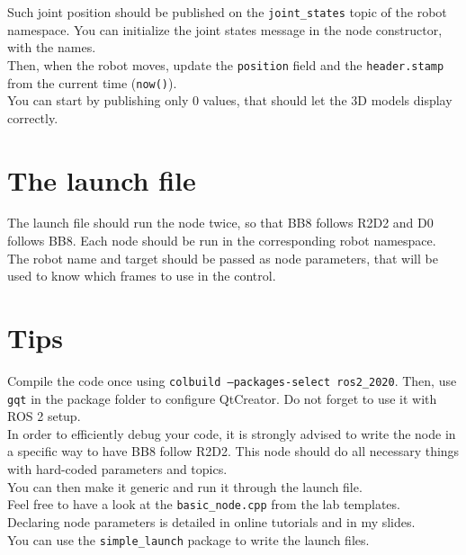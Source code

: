 \documentclass{ecnreport}
\begin{document}
Such joint position should be published on the \texttt{joint\_states} topic of the robot namespace. You can initialize the joint states message in the node constructor, with the names.\\

Then, when the robot moves, update the \texttt{position} field and the \texttt{header.stamp} from the current time (\texttt{now()}).\\

You can start by publishing only 0 values, that should let the 3D models display correctly.

\section{The launch file}

The launch file should run the node twice, so that BB8 follows R2D2 and D0 follows BB8. Each node should be run in the corresponding robot namespace. The robot name and target should be passed as node parameters, that will be used to know which frames to use in the control.
\newpage
\section{Tips}

Compile the code once using \texttt{colbuild --packages-select ros2\_2020}. Then, use \texttt{gqt} in the package folder to configure QtCreator. Do not forget to use it with ROS 2 setup.\\

In order to efficiently debug your code, it is strongly advised to write the node in a specific way to have BB8 follow R2D2. This node should do all necessary things with hard-coded parameters and topics.\\
You can then make it generic and run it through the launch file.\\

Feel free to have a look at the \texttt{basic\_node.cpp} from the lab templates.\\

Declaring node parameters is detailed in online tutorials and in my slides.\\

You can use the \texttt{simple\_launch} package to write the launch files.\\
\end{document}

